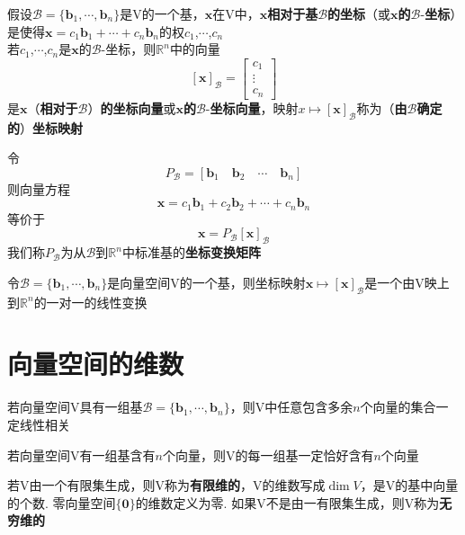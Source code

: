 \begin{definition}
假设$\mathcal{B}=\{\bm{b}_1,\cdots,\bm{b}_n\}$是V的一个基，$\bm{x}$在V中，$\bm{x}$\textbf{相对于基}$\mathcal{B}$\textbf{的坐标}（或$\bm{x}$\textbf{的}$\mathcal{B}$-\textbf{坐标}）是使得$\bm{x}=c_1\bm{b}_1+\cdots+c_n\bm{b}_n$的权$c_1$,$\cdots$,$c_n$\\
若$c_1$,$\cdots$,$c_n$是$\bm{x}$的$\mathcal{B}$-坐标，则$\mathbb{R}^n$中的向量
\[[\bm{x}]_{\mathcal{B}}=\left[
\begin{array}{c}
c_1\\
\vdots\\
c_n
\end{array}
\right]\]
是$\bm{x}$（\textbf{相对于}$\mathcal{B}$）\textbf{的坐标向量}或$\bm{x}$\textbf{的}$\mathcal{B}$-\textbf{坐标向量}，映射$x\mapsto[\bm{x}]_{\mathcal{B}}$称为（\textbf{由}$\mathcal{B}$\textbf{确定的}）\textbf{坐标映射}
\end{definition}\vspace{4ex}

令
\[P_{\mathcal{B}}=[\bm{b}_1\quad\bm{b}_2\quad\cdots\quad\bm{b}_n]\]
则向量方程
\[\bm{x}=c_1\bm{b}_1+c_2\bm{b}_2+\cdots+c_n\bm{b}_n\]
等价于
\[\bm{x}=P_{\mathcal{B}}[\bm{x}]_{\mathcal{B}}\]
我们称$P_{\mathcal{B}}$为从$\mathcal{B}$到$\mathbb{R}^n$中标准基的\textbf{坐标变换矩阵}\\[2ex]

\begin{TheoremOne}
令$\mathcal{B}=\{\bm{b}_1,\cdots,\bm{b}_n\}$是向量空间V的一个基，则坐标映射$\bm{x}\mapsto[\bm{x}]_{\mathcal{B}}$是一个由V映上到$\mathbb{R}^n$的一对一的线性变换
\end{TheoremOne}\vspace{4ex}

\section{向量空间的维数}
\begin{TheoremOne}
若向量空间V具有一组基$\mathcal{B}=\{\bm{b}_1,\cdots,\bm{b}_n\}$，则V中任意包含多余$n$个向量的集合一定线性相关
\end{TheoremOne}\vspace{4ex}

\begin{TheoremOne}
若向量空间V有一组基含有$n$个向量，则V的每一组基一定恰好含有$n$个向量
\end{TheoremOne}\vspace{4ex}

\begin{definition}
若V由一个有限集生成，则V称为\textbf{有限维的}，V的维数写成$\dim V$，是V的基中向量的个数. 零向量空间$\{\mathbf{0}\}$的维数定义为零. 如果V不是由一有限集生成，则V称为\textbf{无穷维的}
\end{definition}\vspace{4ex}

